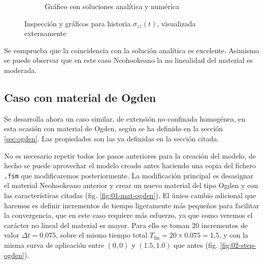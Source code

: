 \begin{figure}[!htbp]
\begin{subfigure}[b]{0.56\textwidth}
\caption{Gráfico con soluciones analítica y numérica}
\label{fig:post-09}
\end{subfigure}
\caption{Inspección y gráficos para historia $\sigma_{zz}(t)$, visualizada externamente}
\label{fig:post-08-09}
\end{figure}
Se comprueba que la coincidencia con la solución analítica es excelente.
Asimismo se puede observar que en este caso Neohookeano la no linealidad del material es moderada.

\subsection{Caso con material de Ogden}

Se desarrolla ahora un caso similar, de extensión no confinada homogénea, en esta ocasión con material de Ogden, según se ha definido en la sección \ref{sec:ogden}.
Las propiedades son las ya definidas en la sección citada.

No es necesario repetir todos los pasos anteriores para la creación del modelo, de hecho se puede aprovechar el modelo creado antes haciendo una copia del fichero \texttt{.fsm} que modificaremos posteriormente.
La modificación principal es desasignar el material Neohookeano anterior y crear un nuevo material del tipo Ogden y con las características citadas (fig. \ref{fig:01-mat-ogden}).
El único cambio adicional que haremos es definir incrementos de tiempo ligeramente más pequeños para facilitar la convergencia, que en este caso requiere más esfuerzo, ya que como veremos el carácter no lineal del material es mayor.
Para ello se toman 20 incrementos de valor $\Delta t=0.075$, sobre el mismo tiempo total $T_\text{fin}=20\times 0.075=1.5$, y con la misma curva de aplicación entre $(0,0)$ y $(1.5,1.0)$ que antes (fig. \ref{fig:02-step-ogden}).

